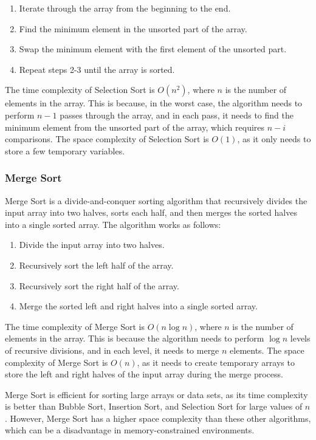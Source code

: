 \documentclass[a4paper]{article}
\begin{document}
\begin{enumerate}
\item Iterate through the array from the beginning to the end.
\item Find the minimum element in the unsorted part of the array.
\item Swap the minimum element with the first element of the unsorted part.
\item Repeat steps 2-3 until the array is sorted.
\end{enumerate}

The time complexity of Selection Sort is $O(n^2)$, where $n$ is the number of elements in the array. This is because, in the worst case, the algorithm needs to perform $n-1$ passes through the array, and in each pass, it needs to find the minimum element from the unsorted part of the array, which requires $n-i$ comparisons. The space complexity of Selection Sort is $O(1)$, as it only needs to store a few temporary variables.



\subsubsection{Merge Sort}
Merge Sort is a divide-and-conquer sorting algorithm that recursively divides the input array into two halves, sorts each half, and then merges the sorted halves into a single sorted array. The algorithm works as follows:

\begin{enumerate}
\item Divide the input array into two halves.
\item Recursively sort the left half of the array.
\item Recursively sort the right half of the array.
\item Merge the sorted left and right halves into a single sorted array.
\end{enumerate}

The time complexity of Merge Sort is $O(n\log n)$, where $n$ is the number of elements in the array. This is because the algorithm needs to perform $\log n$ levels of recursive divisions, and in each level, it needs to merge $n$ elements. The space complexity of Merge Sort is $O(n)$, as it needs to create temporary arrays to store the left and right halves of the input array during the merge process.

Merge Sort is efficient for sorting large arrays or data sets, as its time complexity is better than Bubble Sort, Insertion Sort, and Selection Sort for large values of $n$. However, Merge Sort has a higher space complexity than these other algorithms, which can be a disadvantage in memory-constrained environments.
\end{document}
